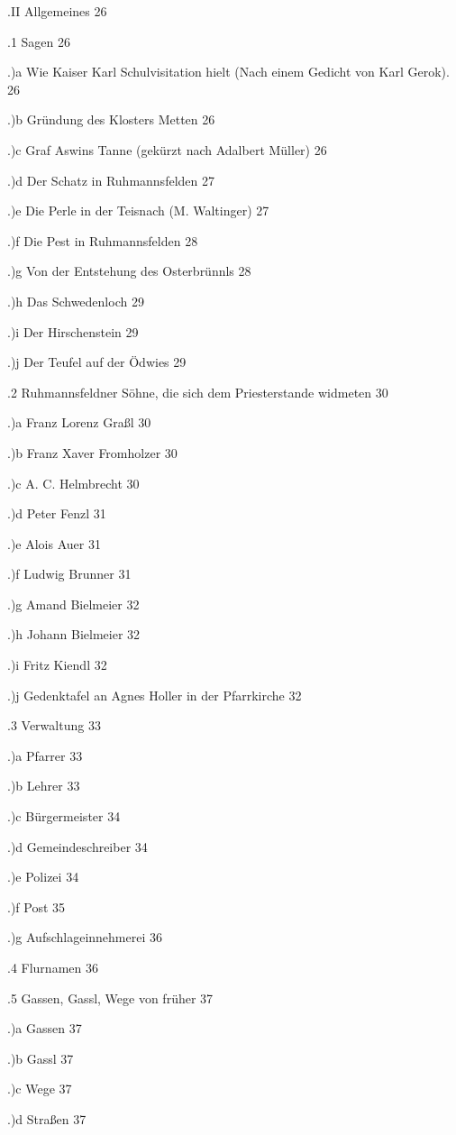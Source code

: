 .II Allgemeines 26

.1 Sagen    26

.)a Wie Kaiser Karl Schulvisitation hielt (Nach einem Gedicht von Karl Gerok). 
26

.)b Gründung des Klosters Metten    26

.)c Graf Aswins Tanne (gekürzt nach Adalbert Müller)    26

.)d Der Schatz in Ruhmannsfelden    27

.)e Die Perle in der Teisnach (M. Waltinger)    27

.)f Die Pest in Ruhmannsfelden  28

.)g Von der Entstehung des Osterbrünnls 28

.)h Das Schwedenloch    29

.)i Der Hirschenstein   29

.)j Der Teufel auf der Ödwies   29

.2 Ruhmannsfeldner Söhne, die sich dem Priesterstande widmeten  30

.)a Franz Lorenz Graßl  30

.)b Franz Xaver Fromholzer  30

.)c A. C. Helmbrecht    30

.)d Peter Fenzl 31

.)e Alois Auer  31

.)f Ludwig Brunner  31

.)g Amand Bielmeier 32

.)h Johann Bielmeier    32

.)i Fritz Kiendl    32

.)j Gedenktafel an Agnes Holler in der Pfarrkirche  32

.3 Verwaltung   33

.)a Pfarrer 33

.)b Lehrer  33

.)c Bürgermeister   34

.)d Gemeindeschreiber   34

.)e Polizei 34

.)f Post    35

.)g Aufschlageinnehmerei    36

.4 Flurnamen    36

.5 Gassen, Gassl, Wege von früher   37

.)a Gassen  37

.)b Gassl   37

.)c Wege    37

.)d Straßen 37

